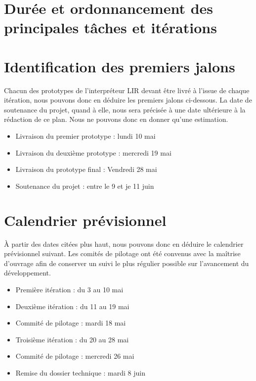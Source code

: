 \documentclass[12pt,a4paper,titlepage,openany]{report}
\begin{document}
    \section{Durée et ordonnancement des principales tâches et itérations}
    \section{Identification des premiers jalons}
        Chacun des prototypes de l'interpréteur LIR devant être livré à l'issue de chaque
        itération, nous pouvons donc en déduire les premiers jalons ci-dessous. La date de
        soutenance du projet, quand à elle, nous sera précisée à une date ultérieure à
        la rédaction de ce plan. Nous ne pouvons donc en donner qu'une estimation.

        \begin{itemize}
            \item Livraison du premier prototype : lundi 10 mai
            \item Livraison du deuxième prototype : mercredi 19 mai
            \item Livraison du prototype final : Vendredi 28 mai
            \item Soutenance du projet : entre le 9 et je 11 juin
        \end{itemize}

    \section{Calendrier prévisionnel}
        \`{A} partir des dates citées plus haut, nous pouvons donc en déduire le
        calendrier prévisionnel suivant. Les comités de pilotage ont été convenus avec
        la maîtrise d'ouvrage afin de conserver un suivi le plus régulier possible sur
        l'avancement du développement.
        \begin{itemize}
            \item Première itération : du 3 au 10 mai
            \item Deuxième itération : du 11 au 19 mai
            \item Commité de pilotage : mardi 18 mai
            \item Troisième itération : du 20 au 28 mai
            \item Commité de pilotage : mercredi 26 mai
            \item Remise du dossier technique : mardi 8 juin
        \end{itemize}
\end{document}
